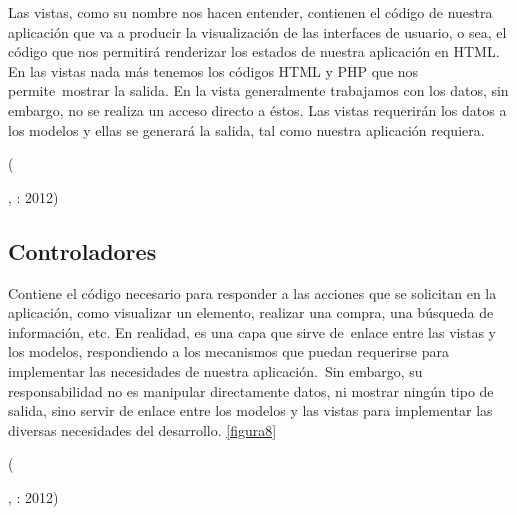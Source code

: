 \begin{center}
  \begin{minipage}{0.9\linewidth}
    \vspace{5pt}%
    {\small

    Las vistas, como su nombre nos hacen entender, contienen el código de nuestra aplicación que va a producir la visualización de las interfaces de usuario, o sea, el código que nos permitirá renderizar los estados de nuestra aplicación en HTML. En las vistas nada más tenemos los códigos HTML y PHP que nos permite mostrar la salida.
    En la vista generalmente trabajamos con los datos, sin embargo, no se realiza un acceso directo a éstos. Las vistas requerirán los datos a los modelos y ellas se generará la salida, tal como nuestra aplicación requiera.
    }
    \begin{flushright}
      (\author{Gutiérrez Javier.},
      : 2012)
    \end{flushright}
      \vspace{5pt}%
  \end{minipage}
\end{center}



\subsection{Controladores}

\begin{center}
  \begin{minipage}{0.9\linewidth}
    \vspace{5pt}%
    {\small

    Contiene el código necesario para responder a las acciones que se solicitan en la aplicación, como visualizar un elemento, realizar una compra, una búsqueda de información, etc.
    En realidad, es una capa que sirve de enlace entre las vistas y los modelos, respondiendo a los mecanismos que puedan requerirse para implementar las necesidades de nuestra aplicación. Sin embargo, su responsabilidad no es manipular directamente datos, ni mostrar ningún tipo de salida, sino servir de enlace entre los modelos y las vistas para implementar las diversas necesidades del desarrollo. \ref{figura8}
    }
    \begin{flushright}
      (\author{Gutiérrez Javier.},
      : 2012)
    \end{flushright}
      \vspace{5pt}%
  \end{minipage}
\end{center}

